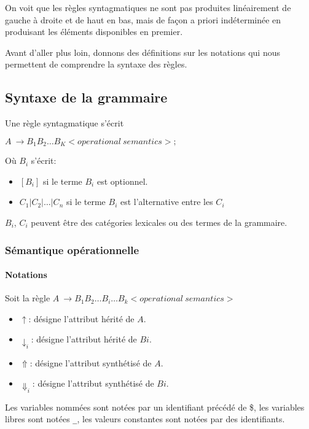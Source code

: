 \documentclass[11pt]{article}
\begin{document}
On voit que les règles syntagmatiques ne sont pas produites
linéairement de gauche à droite et de haut en bas, mais de façon a
priori indéterminée en produisant les éléments disponibles en premier.

Avant d'aller plus loin, donnons des définitions sur les notations qui
  nous permettent de comprendre la syntaxe des règles.
  
\subsection*{Syntaxe de la grammaire}
 
 Une règle syntagmatique s'écrit 

$A~ \rightarrow B_1 B_2 \dots B_K <operational~semantics>;$
 
Où $B_i$ s'écrit:

\begin{itemize}
\item $[ B_i ]$ si le terme $B_i$ est optionnel.
\item $C_1 | C_2 | \dots | C_n$ si le terme $B_i$ est l'alternative
  entre les $C_i$
\end{itemize}
 
$B_i$, $C_i$ peuvent être des catégories lexicales ou des termes de la
grammaire.

\subsubsection*{Sémantique opérationnelle}

\paragraph{Notations}

Soit la règle $A~ \rightarrow B_1 B_2 \dots B_i \dots B_k <operational~semantics>$

\begin{itemize}
\item $\uparrow$: désigne l'attribut hérité de $A$.
\item $\downarrow_i$: désigne l'attribut hérité de $Bi$.
\item $\Uparrow$: désigne l'attribut synthétisé de $A$.
\item $\Downarrow_i$: désigne l'attribut synthétisé de $Bi$. 
\end{itemize}

Les variables nommées sont notées par un identifiant précédé de \og
\$\fg{}, les variables libres sont notées \og \verb#_#\fg{}, les
valeurs constantes sont notées par des identifiants.
\end{document}
